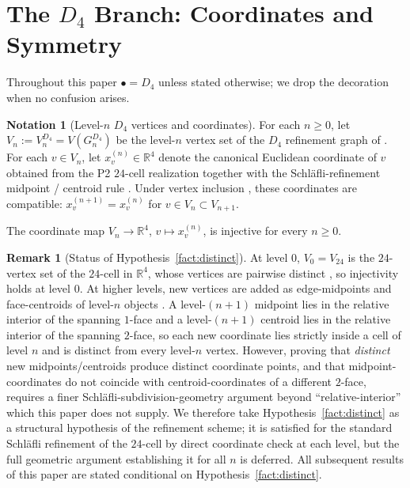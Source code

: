 \documentclass[11pt, a4paper]{amsart}
\theoremstyle{definition}
\newtheorem{remark}[theorem]{Remark}
\newtheorem{notation}[theorem]{Notation}
\newcommand{\R}{\mathbb{R}}
\begin{document}
\section{The $D_4$ Branch: Coordinates and Symmetry}
\label{sec:coords}

Throughout this paper $\bullet = D_4$ unless stated otherwise; we
drop the decoration when no confusion arises.

\begin{notation}[Level-$n$ $D_4$ vertices and coordinates]
\label{not:vertices-coords}
For each $n \geq 0$, let $V_n := V_n^{D_4} = V(G_n^{D_4})$ be the
level-$n$ vertex set of the $D_4$ refinement graph of
\cite[Def.~2.1, Def.~2.2]{RefinementSpaces}. For each
$v \in V_n$, let $x_v^{(n)} \in \R^4$ denote the canonical
Euclidean coordinate of $v$ obtained from the P2
$24$-cell realization \cite[\S 5]{AlgebraicSubstrate} together
with the Schl\"{a}fli-refinement midpoint / centroid rule
\cite[Def.~2.2]{RefinementSpaces}. Under vertex inclusion
\cite[Rmk.~2.3]{RefinementSpaces}, these coordinates are
compatible: $x_v^{(n+1)} = x_v^{(n)}$ for $v \in V_n \subset
V_{n+1}$.
\end{notation}

\begin{hypothesis}
\label{fact:distinct}
The coordinate map $V_n \to \R^4$, $v \mapsto x_v^{(n)}$, is
injective for every $n \geq 0$.
\end{hypothesis}

\begin{remark}[Status of Hypothesis~\ref{fact:distinct}]
\label{rmk:distinct-status}
At level $0$, $V_0 = V_{24}$ is the $24$-vertex set of the
$24$-cell in $\R^4$, whose vertices are pairwise distinct
\cite[\S 5]{AlgebraicSubstrate}, so injectivity holds at level
$0$. At higher levels, new vertices are added as edge-midpoints
and face-centroids of level-$n$ objects
\cite[Def.~2.2]{RefinementSpaces}. A level-$(n+1)$ midpoint lies
in the relative interior of the spanning $1$-face and a
level-$(n+1)$ centroid lies in the relative interior of the
spanning $2$-face, so each new coordinate lies strictly inside a
cell of level $n$ and is distinct from every level-$n$ vertex.
However, proving that \emph{distinct} new midpoints/centroids
produce distinct coordinate points, and that midpoint-coordinates
do not coincide with centroid-coordinates of a different $2$-face,
requires a finer Schl\"afli-subdivision-geometry argument beyond
``relative-interior'' which this paper does not supply. We
therefore take Hypothesis~\ref{fact:distinct} as a structural
hypothesis of the refinement scheme; it is satisfied for the
standard Schl\"afli refinement of the $24$-cell by direct
coordinate check at each level, but the full geometric argument
establishing it for all $n$ is deferred. All subsequent results
of this paper are stated conditional on
Hypothesis~\ref{fact:distinct}.
\end{remark}
\end{document}
